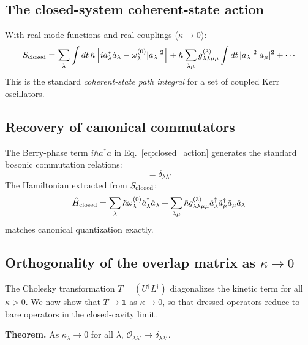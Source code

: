 \documentclass[12pt]{article}
\begin{document}
\subsection{The closed-system coherent-state action}

With real mode functions and real couplings ($\kappa\to 0$):
\begin{equation}
  S_{\rm closed} = \sum_\lambda\int dt\,\hbar
  \left[ia_\lambda^*\dot{a}_\lambda
  -\omega_\lambda^{(0)}|a_\lambda|^2\right]
  +\hbar\sum_{\lambda\mu}
  g^{(3)}_{\lambda\lambda\mu\mu}\int dt\,|a_\lambda|^2|a_\mu|^2
  +\cdots
  \label{eq:closed_action}
\end{equation}
This is the standard \emph{coherent-state path integral} for a set of
coupled Kerr oscillators.

\subsection{Recovery of canonical commutators}

The Berry-phase term $i\hbar a^*\dot{a}$ in Eq.~\eqref{eq:closed_action}
generates the standard bosonic commutation relations:
\begin{equation}
  [\hat{a}_\lambda,\hat{a}_{\lambda'}^\dagger]
  = \delta_{\lambda\lambda'}
  \label{eq:canonical_comm}
\end{equation}
The Hamiltonian extracted from $S_{\rm closed}$:
\begin{equation}
  \hat{H}_{\rm closed} =
  \sum_\lambda\hbar\omega_\lambda^{(0)}\hat{a}_\lambda^\dagger\hat{a}_\lambda
  +\sum_{\lambda\mu}\hbar g^{(3)}_{\lambda\lambda\mu\mu}
  \hat{a}_\lambda^\dagger\hat{a}_\mu^\dagger\hat{a}_\mu\hat{a}_\lambda
  \label{eq:closed_H}
\end{equation}
matches canonical quantization exactly.

\subsection{Orthogonality of the overlap matrix as $\kappa\to 0$}

The Cholesky transformation $T=(U^\dagger L^\dagger)$ diagonalizes the
kinetic term for all $\kappa>0$.  We now show that $T\to\mathbf{1}$ as
$\kappa\to 0$, so that dressed operators reduce to bare operators in the
closed-cavity limit.

\textbf{Theorem.}  As $\kappa_\lambda\to 0$ for all $\lambda$,
$\mathcal{O}_{\lambda\lambda'}\to\delta_{\lambda\lambda'}$.
\end{document}
